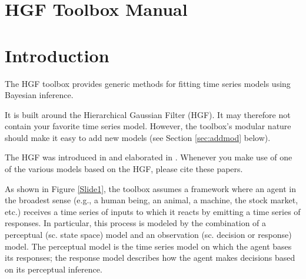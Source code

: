 \documentclass[11pt,a4paper]{article}
\numberwithin{equation}{section}
\begin{document}
\section*{\huge HGF Toolbox Manual}
\label{manual}

\tableofcontents
\pagebreak

\section{Introduction}
\label{sec:intro}

The HGF toolbox provides generic methods for fitting time series
models using Bayesian inference.

It is built around the Hierarchical Gaussian Filter (HGF). It may
therefore not contain your favorite time series model. However, the
toolbox's modular nature should make it easy to add new models (see
Section \ref{sec:addmod} below).

The HGF was introduced in \citet{mathys_bayesian_2011} and elaborated
in \citet{mathys_uncertainty_2014}. Whenever you make use of one of
the various models based on the HGF, please cite these papers.

As shown in Figure \ref{Slide1}, the toolbox assumes a framework where
an agent in the broadest sense (e.g., a human being, an animal, a
machine, the stock market, etc.)  receives a time series of inputs to
which it reacts by emitting a time series of responses. In particular,
this process is modeled by the combination of a perceptual (sc. state
space) model and an observation (sc. decision or response) model. The
perceptual model is the time series model on which the agent bases its
responses; the response model describes how the agent makes decisions
based on its perceptual inference.
\end{document}
